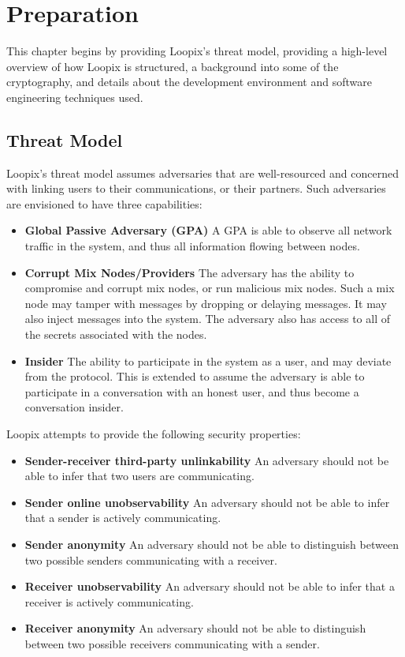 \documentclass[final,dissertation.tex]{subfiles}
\begin{document}
\chapter{Preparation}

This chapter begins by providing Loopix's threat model, providing a high-level overview of how Loopix is structured, a background into some of the cryptography, and details about the development environment and software engineering techniques used.

\section{Threat Model}

Loopix's threat model assumes adversaries that are well-resourced and concerned with linking users to their communications, or their partners. Such adversaries are envisioned to have three capabilities:

\begin{itemize}
	\item \textbf{Global Passive Adversary (GPA)} A GPA is able to observe all network traffic in the system, and thus all information flowing between nodes.
	\item \textbf{Corrupt Mix Nodes/Providers} The adversary has the ability to compromise and corrupt mix nodes, or run malicious mix nodes. Such a mix node may tamper with messages by dropping or delaying messages. It may also inject messages into the system. The adversary also has access to all of the secrets associated with the nodes.
	\item \textbf{Insider} The ability to participate in the system as a user, and may deviate from the protocol. This is extended to assume the adversary is able to participate in a conversation with an honest user, and thus become a conversation insider.
\end{itemize}

Loopix attempts to provide the following security properties:

\begin{itemize}
	\item \textbf{Sender-receiver third-party unlinkability} An adversary should not be able to infer that two users are communicating.
	\item \textbf{Sender online unobservability} An adversary should not be able to infer that a sender is actively communicating.
	\item \textbf{Sender anonymity} An adversary should not be able to distinguish between two possible senders communicating with a receiver.
	\item \textbf{Receiver unobservability} An adversary should not be able to infer that a receiver is actively communicating.
	\item \textbf{Receiver anonymity} An adversary should not be able to distinguish between two possible receivers communicating with a sender.
\end{itemize}
\end{document}
